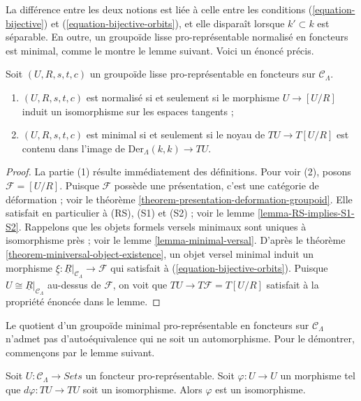 \noindent
La différence entre les deux notions est liée à celle entre les conditions
(\ref{equation-bijective}) et (\ref{equation-bijective-orbits}), et elle
disparaît lorsque $k' \subset k$ est séparable. En outre, un groupoïde lisse
pro-représentable normalisé en foncteurs est minimal, comme le montre le lemme
suivant. Voici un énoncé précis.

\begin{lemma}
\label{lemma-characterize-minimal-groupoid-in-functors}
Soit $(U, R, s, t, c)$ un groupoïde lisse pro-représentable en foncteurs sur
$\mathcal{C}_\Lambda$.
\begin{enumerate}
\item $(U, R, s, t, c)$ est normalisé si et seulement si le morphisme
$U \to [U/R]$ induit un isomorphisme sur les espaces tangents ;
\item $(U, R, s, t, c)$ est minimal si et seulement si le noyau de
$TU \to T[U/R]$ est contenu dans l'image de
$\text{Der}_\Lambda(k, k) \to TU$.
\end{enumerate}
\end{lemma}

\begin{proof}
La partie (1) résulte immédiatement des définitions. Pour voir (2), posons
$\mathcal{F} = [U/R]$. Puisque $\mathcal{F}$ possède une présentation, c'est
une catégorie de déformation ; voir le théorème
\ref{theorem-presentation-deformation-groupoid}. Elle satisfait en particulier
à (RS), (S1) et (S2) ; voir le lemme \ref{lemma-RS-implies-S1-S2}. Rappelons
que les objets formels versels minimaux sont uniques à isomorphisme près ; voir
le lemme \ref{lemma-minimal-versal}. D'après le théorème
\ref{theorem-miniversal-object-existence}, un objet versel minimal induit un
morphisme
$\underline{\xi} : \underline{R}|_{\mathcal{C}_\Lambda} \to \mathcal{F}$
qui satisfait à (\ref{equation-bijective-orbits}). Puisque
$U \cong \underline{R}|_{\mathcal{C}_\Lambda}$ au-dessus de $\mathcal{F}$, on
voit que $TU \to T\mathcal{F} = T[U/R]$ satisfait à la propriété énoncée dans
le lemme.
\end{proof}

\noindent
Le quotient d'un groupoïde minimal pro-représentable en foncteurs sur $\mathcal
C_\Lambda$ n'admet pas d'autoéquivalence qui ne soit un automorphisme. Pour le
démontrer, commençons par le lemme suivant.

\begin{lemma}
\label{lemma-surjective-morphism-prorepresentable-functor}
Soit $U: \mathcal{C}_\Lambda \to \textit{Sets}$ un foncteur
pro-représentable. Soit $\varphi : U \to U$ un morphisme tel que
$d\varphi : TU \to TU$ soit un isomorphisme. Alors $\varphi$ est un
isomorphisme.
\end{lemma}

